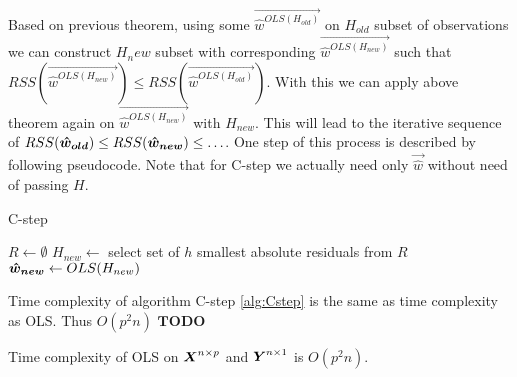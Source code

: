 
\begin{corollary} 
	Based on previous theorem, using some $\vec{\hat{w}^{OLS(H_{old})}}$  on $H_{old}$ subset of observations we can
	construct $H_new$ subset with corresponding $\vec{\hat{w}^{OLS(H_{new})}}$ such that $RSS(\vec{\hat{w}^{OLS(H_{new})}}) \leq RSS(\vec{\hat{w}^{OLS(H_{old})}})$. 
	With this we can apply above theorem again on $\vec{\hat{w}^{OLS(H_{new})}}$ with $H_{new}$. This will lead to the iterative sequence of
	$RSS(\boldsymbol{\hat{w}_{old}}) \leq RSS(\boldsymbol{\hat{w}_{new}}) \leq \ldots$. One step of this process is described by following pseudocode. Note that for C-step we actually need only $\vec{\hat{w}}$ 
	 without need of passing  $H$.
\end{corollary}

\begin{algorithm}[H]
	\label{alg:Cstep}
	\caption{C-step}
	
	$R \gets \emptyset$\;
	$H_{new} \gets $ select set of $h$ smallest absolute residuals from $R$\;
	$\boldsymbol{\hat{w}_{new}} \gets OLS(H_{new})$\;
	\;
\end{algorithm}

\begin{observation} 
	Time complexity of algorithm C-step \ref{alg:Cstep} is the same as time complexity as OLS. Thus $O(p^2n)$
	$\boldsymbol{{TODO}}$
\end{observation} 

\begin{lemma}
	Time complexity of OLS  on $\m{X}^{n \times p}$ and $\m{Y}^{n \times 1}$ is $O(p^2n)$.
\end{lemma}

